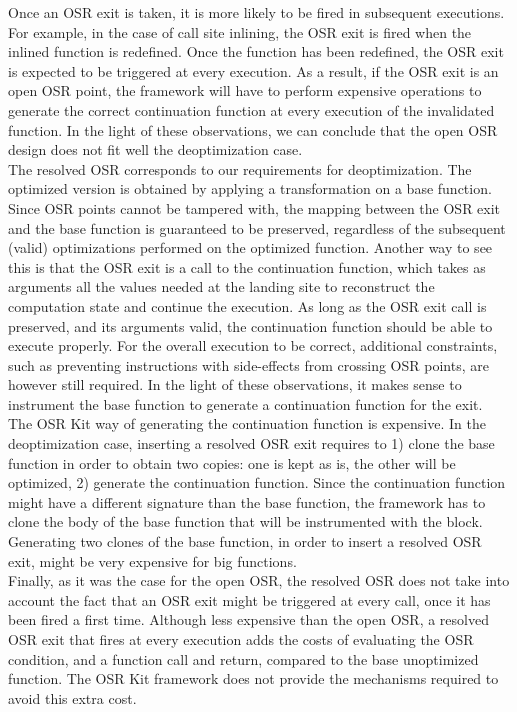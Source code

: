 Once an OSR exit is taken, it is more likely to be fired in subsequent executions.
For example, in the case of call site inlining, the OSR exit is fired when the inlined function is redefined.
Once the function has been redefined, the OSR exit is expected to be triggered at every execution.
As a result, if the OSR exit is an open OSR point, the framework will have to perform expensive operations to generate the correct continuation function at every execution of the invalidated function.
In the light of these observations, we can conclude that the open OSR design does not fit well the deoptimization case.\\

The resolved OSR corresponds to our requirements for deoptimization.
The optimized version is obtained by applying a transformation on a base function.
Since OSR points cannot be tampered with, the mapping between the OSR exit and the base function is guaranteed to be preserved, regardless of the subsequent (valid) optimizations performed on the optimized function.
Another way to see this is that the OSR exit is a call to the continuation function, which takes as arguments all the values needed at the landing site to reconstruct the computation state and continue the execution.
As long as the OSR exit call is preserved, and its arguments valid, the continuation function should be able to execute properly.
For the overall execution to be correct, additional constraints, such as preventing instructions with side-effects from crossing OSR points, are however still required.
In the light of these observations, it makes sense to instrument the base function to generate a continuation function for the exit.\\

The OSR Kit way of generating the continuation function is expensive.
In the deoptimization case, inserting a resolved OSR exit requires to 1) clone the base function in order to obtain two copies: one is kept as is, the other will be optimized, 2) generate the continuation function. 
Since the continuation function might have a different signature than the base function, the framework has to clone the body of the base function that will be instrumented with the  block.
Generating two clones of the base function, in order to insert a resolved OSR exit, might be very expensive for big functions.\\

Finally, as it was the case for the open OSR, the resolved OSR does not take into account the fact that an OSR exit might be triggered at every call, once it has been fired a first time.
Although less expensive than the open OSR, a resolved OSR exit that fires at every execution adds the costs of evaluating the OSR condition, and a function call and return, compared to the base unoptimized function.
The OSR Kit framework does not provide the mechanisms required to avoid this extra cost.\\

